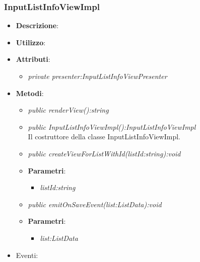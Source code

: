 \subsubsection{InputListInfoViewImpl}
\begin{itemize}
\item \textbf{Descrizione}: 
\item \textbf{Utilizzo}:
\item \textbf{Attributi}: 
	\begin{itemize}
	\item \textit{private presenter:InputListInfoViewPresenter}\\
	
	\end{itemize}
\item \textbf{Metodi}:
	\begin{itemize}	
	\item \textit{public renderView():string}\\
	
	\item \textit{public InputListInfoViewImpl():InputListInfoViewImpl}\\
	Il costruttore della classe InputListInfoViewImpl.
	\item \textit{public createViewForListWithId(listId:string):void}\\
	
			\item{\textbf{Parametri}: \begin{itemize}
			\item \textit{listId:string}\\
	
			\end{itemize}}
	\item \textit{public emitOnSaveEvent(list:ListData):void}\\

			\item{\textbf{Parametri}: \begin{itemize}
			\item \textit{list:ListData}\\

			\end{itemize}}
	\end{itemize}
\item{Eventi}:
\end{itemize}

